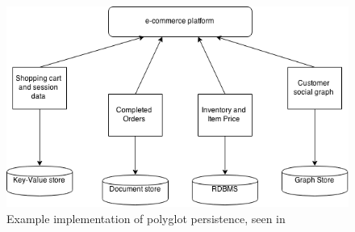 \begin{figure}[h!]
\centering
\includegraphics[scale=0.5]{figure/Polyglot.png}
\caption{Example implementation of polyglot persistence, seen in \cite{NoSQLDistilled}}
\label{fig:polyglot}
\end{figure}

